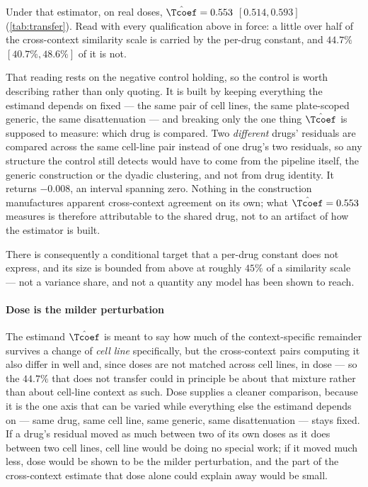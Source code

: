 Under that estimator, on real doses, $\hat{\Tcoef} = 0.553$ $[0.514, 0.593]$
(\cref{tab:transfer}). Read with every qualification above in force: a little over
half of the cross-context similarity scale is carried by the per-drug constant,
and $44.7\%$ $[40.7\%, 48.6\%]$ of it is not.

That reading rests on the negative control holding, so the control is worth
describing rather than only quoting. It is built by keeping everything the
estimand depends on fixed --- the same pair of cell lines, the same plate-scoped
generic, the same disattenuation --- and breaking only the one thing $\hat{\Tcoef}$
is supposed to measure: which drug is compared. Two \emph{different} drugs' residuals
are compared across the same cell-line pair instead of one drug's two residuals,
so any structure the control still detects would have to come from the pipeline
itself, the generic construction or the dyadic clustering, and not from drug
identity. It returns $-0.008$, an interval spanning zero. Nothing in the
construction manufactures apparent cross-context agreement on its own; what
$\hat{\Tcoef} = 0.553$ measures is therefore attributable to the shared drug, not
to an artifact of how the estimator is built.

There is consequently a conditional target that a per-drug constant does not
express, and its size is bounded from above at roughly $45\%$ of a similarity
scale --- not a variance share, and not a quantity any model has been shown to
reach.

\paragraph{Dose is the milder perturbation} The estimand $\hat{\Tcoef}$ is meant
to say how much of the context-specific remainder survives a change of
\emph{cell line} specifically, but the cross-context pairs computing it also
differ in well and, since doses are not matched across cell lines, in dose ---
so the $44.7\%$ that does not transfer could in principle be about that mixture
rather than about cell-line context as such. Dose supplies a cleaner comparison,
because it is the one axis that can be varied while everything else the
estimand depends on --- same drug, same cell line, same generic, same
disattenuation --- stays fixed. If a drug's residual moved as much between two
of its own doses as it does between two cell lines, cell line would be doing no
special work; if it moved much less, dose would be shown to be the milder
perturbation, and the part of the cross-context estimate that dose alone could
explain away would be small.


